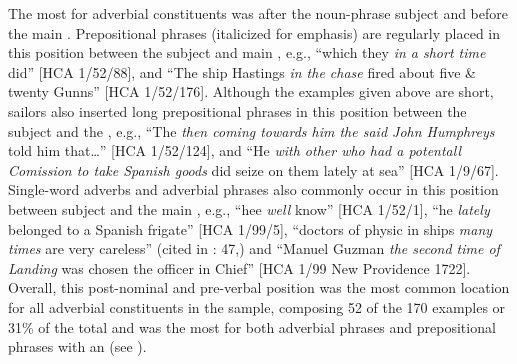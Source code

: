 The most  for adverbial constituents was after the noun-phrase subject and before the main . Prepositional phrases (italicized for emphasis) are regularly placed in this position between the subject and main , e.g., “which they \textit{in a short time} did” [HCA 1/52/88], and “The ship Hastings \textit{in the chase} fired about five \& twenty Gunns” [HCA 1/52/176]. Although the examples given above are short, sailors also inserted long prepositional phrases in this position between the subject and the , e.g., “The  \textit{then coming towards him the said John Humphreys} told him that…” [HCA 1/52/124], and “He \textit{with other who had a potentall Comission to take Spanish goods} did seize on them lately at sea” [HCA 1/9/67]. Single-word adverbs and adverbial phrases also commonly occur in this position between subject and the main , e.g., “hee \textit{well} know” [HCA 1/52/1], “he \textit{lately} belonged to a Spanish frigate” [HCA 1/99/5], “doctors of physic in ships \textit{many times} are very careless” (cited in \citealt{Brown2011}: 47,) and “Manuel Guzman \textit{the second time of Landing} was chosen the officer in Chief” [HCA 1/99 New Providence 1722]. Overall, this post-nominal and pre-verbal position was the most common location for all adverbial constituents in the sample, composing 52 of the 170 examples or 31\% of the total and was the most  for both adverbial phrases and prepositional phrases with an  (see ). 

